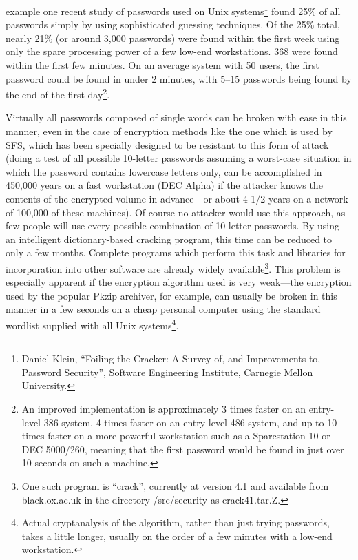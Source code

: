 example one recent study of passwords used on Unix systems\footnote{
		Daniel Klein, ``Foiling the Cracker: A Survey of, and Improvements
              	to, Password Security'', Software Engineering Institute, Carnegie
              	Mellon University.
} found 25\% of all
passwords simply by using sophisticated guessing techniques.  Of the 25\% total,
nearly 21\% (or around 3,000 passwords) were found within the first week using
only the spare processing power of a few low-end workstations.  368 were found
within the first few minutes.  On an average system with 50 users, the first
password could be found in under 2 minutes, with 5--15 passwords being found by
the end of the first day\footnote{
		An improved implementation is approximately 3 times faster on an
              	entry-level 386 system, 4 times faster on an entry-level 486
              	system, and up to 10 times faster on a more powerful workstation
              	such as a Sparcstation 10 or DEC 5000/260, meaning that the first
              	password would be found in just over 10 seconds on such a
              	machine.
}.

Virtually all passwords composed of single words can be broken with ease in
this manner, even in the case of encryption methods like the one which is used
by SFS, which has been specially designed to be resistant to this form of
attack (doing a test of all possible 10-letter passwords assuming a worst-case
situation in which the password contains lowercase letters only, can be
accomplished in 450,000 years on a fast workstation (DEC Alpha) if the attacker
knows the contents of the encrypted volume in advance---or about 4 1/2 years on
a network of 100,000 of these machines).  Of course no attacker would use this
approach, as few people will use every possible combination of 10 letter
passwords.  By using an intelligent dictionary-based cracking program, this
time can be reduced to only a few months.  Complete programs which perform this
task and libraries for incorporation into other software are already widely
available\footnote{
		One such program is ``crack'', currently at version 4.1 and
              	available from black.ox.ac.uk in the directory /src/security as
              	crack41.tar.Z.
}. This problem is especially apparent if the encryption algorithm used
is very weak---the encryption used by the popular Pkzip archiver, for example,
can usually be broken in this manner in a few seconds on a cheap personal
computer using the standard wordlist supplied with all Unix systems\footnote{
		Actual cryptanalysis of the algorithm, rather than just trying
              	passwords, takes a little longer, usually on the order of a few
              	minutes with a low-end workstation.
}.


